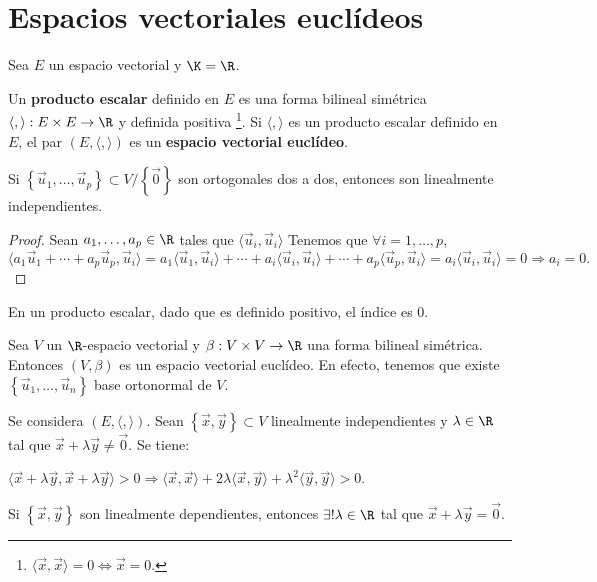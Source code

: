 \chapter{Espacios vectoriales euclídeos}
Sea $\displaystyle E $ un espacio vectorial y $\displaystyle \K = \R $.
\begin{fdefinition}
\normalfont Un \textbf{producto escalar} definido en $\displaystyle E $ es una forma bilineal simétrica $\displaystyle \langle , \rangle : E \times E \to \R $ y definida positiva \footnote{$\displaystyle \langle \vec{x},\vec{x} \rangle = 0 \iff \vec{x} = 0 $.}. Si $\displaystyle \langle,\rangle  $ es un producto escalar definido en $\displaystyle E $, el par $\displaystyle \left(E, \langle,\rangle \right) $ es un \textbf{espacio vectorial euclídeo}.
\end{fdefinition}
\begin{fprop}[]
	\normalfont Si $\displaystyle \left\{ \vec{u}_{1}, \ldots, \vec{u}_{p}\right\} \subset V/ \left\{ \vec{0}\right\}  $ son ortogonales dos a dos, entonces son linealmente independientes.
\end{fprop}
\begin{proof}
Sean $\displaystyle a_{1}, \ldots, a_{p} \in \R $ tales que $\displaystyle \langle \vec{u}_{i}, \vec{u}_{i}\rangle $ 
Tenemos que $\displaystyle \forall i = 1, \ldots, p $, 
\[ \langle a_{1}\vec{u}_{1} + \cdots + a_{p}\vec{u}_{p}, \vec{u}_{i}\rangle = a_{1}\langle \vec{u}_{1}, \vec{u}_{i}\rangle + \cdots + a_{i}\langle \vec{u}_{i}, \vec{u}_{i}\rangle + \cdots + a_{p}\langle \vec{u}_{p}, \vec{u}_{i}\rangle = a_{i}\langle \vec{u}_{i}, \vec{u}_{i}\rangle = 0 \Rightarrow a_{i} = 0 .\]
\end{proof}
\begin{observation}
\normalfont En un producto escalar, dado que es definido positivo, el índice es 0.
\end{observation}
Sea $\displaystyle V $ un $\displaystyle \R $-espacio vectorial y $\displaystyle \beta : V \times V \to \R $ una forma bilineal simétrica. Entonces $\displaystyle \left(V,\beta \right) $ es un espacio vectorial euclídeo. En efecto, tenemos que existe $\displaystyle \left\{ \vec{u}_{1}, \ldots, \vec{u}_{n}\right\}  $ base ortonormal de $\displaystyle V $.
\begin{fprop}[]
	\normalfont Se considera $\displaystyle \left(E, \langle,\rangle \right) $. Sean $\displaystyle \left\{ \vec{x}, \vec{y}\right\} \subset V $ linealmente independientes y $\displaystyle \lambda \in \R $ tal que $\displaystyle \vec{x} + \lambda \vec{y} \neq \vec{0} $. Se tiene:
	\begin{description}
	\item[(i)] $\displaystyle \langle \vec{x} + \lambda \vec{y}, \vec{x} + \lambda \vec{y} \rangle > 0 \Rightarrow \langle \vec{x}, \vec{x} \rangle + 2\lambda \langle \vec{x}, \vec{y}\rangle + \lambda ^{2}\langle \vec{y}, \vec{y} \rangle >0$.
	\item Si $\displaystyle \left\{ \vec{x}, \vec{y}\right\}  $ son linealmente dependientes, entonces $\displaystyle \exists ! \lambda \in \R $ tal que $\displaystyle \vec{x} + \lambda \vec{y} = \vec{0} $.
	\end{description}
\end{fprop}
